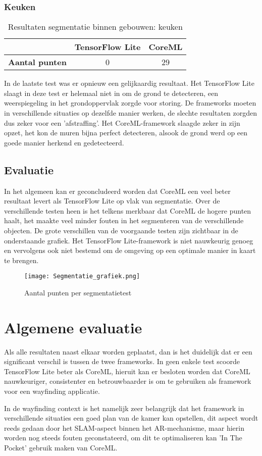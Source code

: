 \subsubsection{Keuken}
\begin{table}[H]
	\centering
	\begin{tabular}{|c|c|c|}
		\hline
		& \textbf{TensorFlow Lite} & \textbf{CoreML} \\ \hline
		\textbf{Aantal punten} & 0                        & 29              \\ \hline
	\end{tabular}
	\caption{Resultaten segmentatie binnen gebouwen: keuken}
\end{table}
In de laatste test was er opnieuw een gelijkaardig resultaat. Het TensorFlow Lite slaagt in deze test er helemaal niet in om de grond te detecteren, een weerspiegeling in het grondoppervlak zorgde voor storing. De frameworks moeten in verschillende situaties op dezelfde manier werken, de slechte resultaten zorgden dus zeker voor een 'afstraffing'. Het CoreML-framework slaagde zeker in zijn opzet, het kon de muren bijna perfect detecteren, alsook de grond werd op een goede manier  herkend en gedetecteerd.

\subsection{Evaluatie}
In het algemeen kan er geconcludeerd worden dat CoreML een veel beter resultaat levert als TensorFlow Lite op vlak van segmentatie. Over de verschillende testen heen is het telkens merkbaar dat CoreML de hogere punten haalt, het maakte veel minder fouten in het segmenteren van de verschillende objecten. De grote verschillen van de voorgaande testen zijn zichtbaar in de onderstaande grafiek. Het TensorFlow Lite-framework is niet nauwkeurig genoeg en vervolgens ook niet bestemd om de omgeving op een optimale manier in kaart te brengen.
\begin{figure}[H]
	\centering
	\texttt{[image: Segmentatie\_grafiek.png]}
	\caption{Aantal punten per segmentatietest}
\end{figure}

\section{Algemene evaluatie}
Als alle resultaten naast elkaar worden geplaatst, dan is het duidelijk dat er een significant verschil is tussen de twee frameworks. In geen enkele test scoorde TensorFlow Lite beter als CoreML, hieruit kan er besloten worden dat CoreML nauwkeuriger, consistenter en betrouwbaarder is om te gebruiken als framework voor een wayfinding applicatie. 

In de wayfinding context is het namelijk zeer belangrijk dat het framework in verschillende situaties een goed plan van de kamer kan opstellen, dit aspect wordt reeds gedaan door het SLAM-aspect binnen het AR-mechanisme, maar hierin worden nog steeds fouten geconstateerd, om dit te optimaliseren kan 'In The Pocket' gebruik maken van CoreML.

